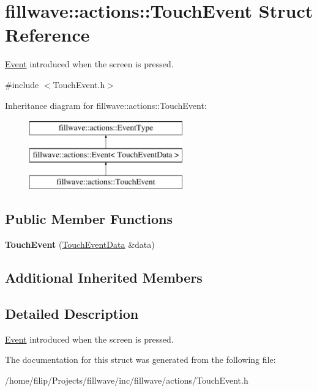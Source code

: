 \hypertarget{classfillwave_1_1actions_1_1TouchEvent}{}\section{fillwave\+:\+:actions\+:\+:Touch\+Event Struct Reference}
\label{classfillwave_1_1actions_1_1TouchEvent}


\hyperlink{classfillwave_1_1actions_1_1Event}{Event} introduced when the screen is pressed.  




{\ttfamily \#include $<$Touch\+Event.\+h$>$}

Inheritance diagram for fillwave\+:\+:actions\+:\+:Touch\+Event\+:\begin{figure}[H]
\begin{center}
\leavevmode
\includegraphics[height=3.000000cm]{classfillwave_1_1actions_1_1TouchEvent}
\end{center}
\end{figure}
\subsection*{Public Member Functions}
\begin{DoxyCompactItemize}
\item 
\hypertarget{classfillwave_1_1actions_1_1TouchEvent_af128ebf9b057a6c5b89715dae46f197d}{}{\bfseries Touch\+Event} (\hyperlink{structfillwave_1_1actions_1_1TouchEventData}{Touch\+Event\+Data} \&data)\label{classfillwave_1_1actions_1_1TouchEvent_af128ebf9b057a6c5b89715dae46f197d}

\end{DoxyCompactItemize}
\subsection*{Additional Inherited Members}


\subsection{Detailed Description}
\hyperlink{classfillwave_1_1actions_1_1Event}{Event} introduced when the screen is pressed. 

The documentation for this struct was generated from the following file\+:\begin{DoxyCompactItemize}
\item 
/home/filip/\+Projects/fillwave/inc/fillwave/actions/Touch\+Event.\+h\end{DoxyCompactItemize}
